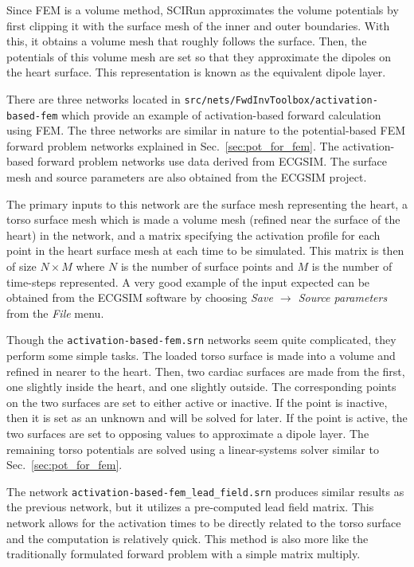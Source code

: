 \documentclass[fleqn,11pt,openany]{book}
\begin{document}
Since FEM is a volume method, SCIRun approximates the volume potentials
by first clipping it with the surface mesh of the inner and outer boundaries.
With this, it obtains a volume mesh that roughly follows the surface. Then, the
potentials of this volume mesh are set so that they approximate the dipoles
on the heart surface. This representation is known as the equivalent dipole
layer.

There are three networks located in {\tt  src/nets/FwdInvToolbox/activation-based-fem}
which provide an example of activation-based forward calculation
using FEM. The three networks are similar in nature to the potential-based
FEM forward problem networks explained in Sec.~\ref{sec:pot_for_fem}.
The activation-based forward problem networks use data derived from ECGSIM.
The surface mesh and source parameters are also obtained from the ECGSIM
project.

The primary inputs to this network are the surface mesh representing
the heart, a torso surface mesh which is made a volume mesh
(refined near the surface of the heart) in the network, and
a matrix specifying the activation profile for each point in the heart
surface mesh at each time to be simulated. This matrix is then of size
$N \times M$ where $N$ is the number of surface points and $M$ is the
number of time-steps represented. A very good example of the input
expected can be obtained from the ECGSIM software by choosing {\em
Save $\rightarrow$ Source parameters} from the {\em File} menu.

Though the {\tt activation-based-fem.srn} networks seem quite complicated,
they perform some simple tasks. The loaded torso surface is made into a
volume and refined in nearer to the heart. Then, two cardiac surfaces are
made from the first, one slightly inside the heart, and one slightly outside.
The corresponding points on the two surfaces are set to either active or inactive.
If the point is inactive, then it is set as an unknown and will be solved for later. If
the point is active, the two surfaces are set to opposing values to approximate a
dipole layer. The remaining torso potentials are solved using a linear-systems
solver similar to Sec.~\ref{sec:pot_for_fem}.

The network {\tt activation-based-fem\_lead\_field.srn} produces similar results
as the previous network, but it utilizes a pre-computed lead field matrix. This
network allows for the activation times to be directly related to the torso surface
and the computation is relatively quick. This method is also more like the
traditionally formulated forward problem with a simple matrix multiply.
\end{document}
